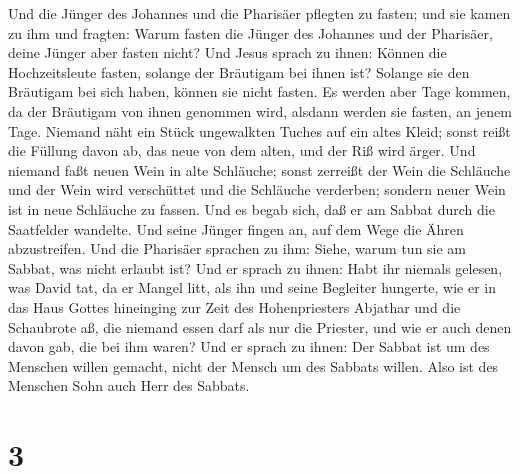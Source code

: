 Und die Jünger des Johannes und die Pharisäer pflegten zu fasten; und
sie kamen zu ihm und fragten: Warum fasten die Jünger des Johannes und
der Pharisäer, deine Jünger aber fasten nicht?  Und Jesus
sprach zu ihnen: Können die Hochzeitsleute fasten, solange der Bräutigam
bei ihnen ist? Solange sie den Bräutigam bei sich haben, können sie
nicht fasten.  Es werden aber Tage kommen, da der
Bräutigam von ihnen genommen wird, alsdann werden sie fasten, an jenem
Tage.  Niemand näht ein Stück ungewalkten Tuches auf ein
altes Kleid; sonst reißt die Füllung davon ab, das neue von dem alten,
und der Riß wird ärger.  Und niemand faßt neuen Wein in
alte Schläuche; sonst zerreißt der Wein die Schläuche und der Wein wird
verschüttet und die Schläuche verderben; sondern neuer Wein ist in neue
Schläuche zu fassen.  Und es begab sich, daß er am Sabbat
durch die Saatfelder wandelte. Und seine Jünger fingen an, auf dem Wege
die Ähren abzustreifen.  Und die Pharisäer sprachen zu
ihm: Siehe, warum tun sie am Sabbat, was nicht erlaubt ist?
 Und er sprach zu ihnen: Habt ihr niemals gelesen, was
David tat, da er Mangel litt, als ihn und seine Begleiter hungerte,
 wie er in das Haus Gottes hineinging zur Zeit des
Hohenpriesters Abjathar und die Schaubrote aß, die niemand essen darf
als nur die Priester, und wie er auch denen davon gab, die bei ihm
waren?  Und er sprach zu ihnen: Der Sabbat ist um des
Menschen willen gemacht, nicht der Mensch um des Sabbats willen.
 Also ist des Menschen Sohn auch Herr des Sabbats.

\hypertarget{section-2}{%
\section{3}\label{section-2}}

